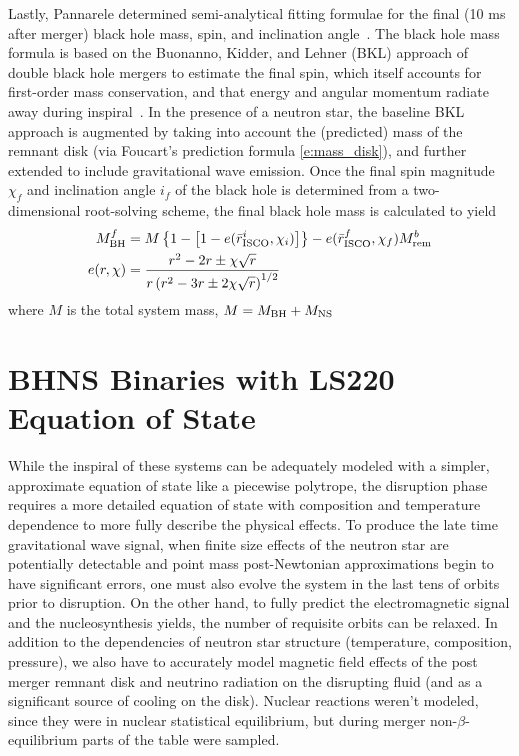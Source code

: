Lastly, Pannarele determined semi-analytical fitting formulae for the final (10 ms after merger) black hole mass, spin, and inclination angle~\cite{PannaraleEtAl2013,Pannarale:2014}.
The black hole mass formula is based on the Buonanno, Kidder, and Lehner (BKL) approach of double black hole mergers to estimate the final spin, which itself accounts for first-order mass conservation, and that energy and angular momentum radiate away during inspiral~\cite{Buonanno2008a}.  
In the presence of a neutron star, the baseline BKL approach is augmented by taking into account the (predicted) mass of the remnant disk (via Foucart's prediction formula \ref{e:mass_disk}), and further extended to include gravitational wave emission.
Once the final spin magnitude  $\chi_f$ and inclination angle $i_f$ of the black hole is determined from a two-dimensional root-solving scheme, the final black hole mass is calculated to yield
\begin{align}
M^f_{\rm BH} &= 
M \left \{ 
1 - \left[1-e(\bar{r}^i_{\rm ISCO}, \chi_i) \right]
\right \}
- e(\bar{r}^f_{\rm ISCO}, \chi_f) M^b_{\rm rem}\\
e(r, \chi) &= 
\frac{ r^2 - 2 r \pm \chi \sqrt{r} }
{ r \left(r^2 - 3r \pm 2 \chi \sqrt{r}\right)^{1/2} }
\end{align}
where $M$ is the total system mass, $M = M_{\rm BH} +M_{\rm NS}$

\section{BHNS Binaries with LS220 Equation of State}

While the inspiral of these systems can be adequately modeled with a simpler, approximate equation of state like a piecewise polytrope, the disruption phase requires a more detailed equation of state with composition and temperature dependence to more fully describe the physical effects.  
To produce the late time gravitational wave signal, when finite size effects of the neutron star are potentially detectable and point mass post-Newtonian approximations begin to have significant errors, one must also evolve the system in the last tens of orbits prior to disruption.  
On the other hand, to fully predict the electromagnetic signal and the nucleosynthesis yields, the number of requisite orbits can be relaxed.  
In addition to the dependencies of neutron star structure (temperature, composition, pressure), we also have to accurately model magnetic field effects of the post merger remnant disk and neutrino radiation on the disrupting fluid (and as a significant source of cooling on the disk).
Nuclear reactions weren't modeled, since they were in nuclear statistical equilibrium, but during merger non-$\beta$-equilibrium parts of the table were sampled.

